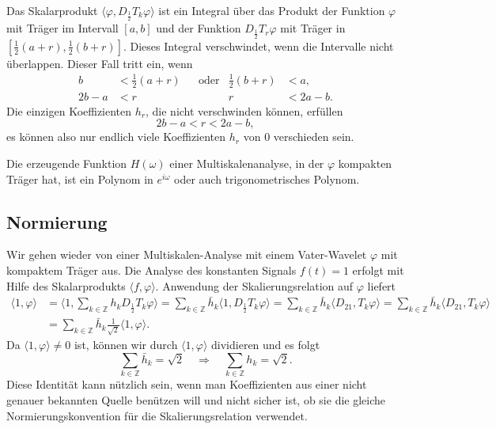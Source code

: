 Das Skalarprodukt
$\langle \varphi, D_{\frac12}T_k\varphi\rangle$
ist ein Integral über das Produkt der Funktion $\varphi$ mit Träger im Intervall
$[a,b]$ und der Funktion $D_{\frac12}T_r\varphi$  mit Träger in
$[\frac12(a+r),\frac12(b+r)]$.
Dieses Integral verschwindet, wenn die Intervalle nicht überlappen.
Dieser Fall tritt ein, wenn
\[
\begin{aligned}
b&<\frac12(a+r) &&\text{oder}& \frac12(b+r) &< a,
\\
2b-a&<r         &&           &            r &< 2a-b.
\end{aligned}
\]
Die einzigen Koeffizienten $h_r$, die nicht verschwinden können, erfüllen
\[
2b-a < r < 2a-b,
\]
es können also nur endlich viele Koeffizienten $h_r$ von $0$ verschieden
sein.

\begin{konsequenz}
Die erzeugende Funktion $H(\omega)$ einer Multiskalenanalyse, in der
$\varphi$ kompakten Träger hat, ist ein Polynom in $e^{i\omega}$ oder auch
trigonometrisches Polynom.
\end{konsequenz}

\subsection{Normierung}
%
Wir gehen wieder von einer Multiskalen-Analyse mit einem Vater-Wavelet
$\varphi$ mit kompaktem Träger aus.
Die Analyse des konstanten Signals $f(t)=1$ erfolgt mit Hilfe des
Skalarprodukts $\langle f,\varphi\rangle$.
Anwendung der Skalierungsrelation auf $\varphi$ liefert
\begin{align*}
\langle 1,\varphi\rangle
&=
\biggl\langle
1,\sum_{k\in\mathbb Z} h_kD_{\frac12}T_k\varphi
\biggr\rangle
=
\sum_{k\in\mathbb Z}
\bar{h}_k
\langle
1,
D_{\frac12}T_k\varphi
\rangle
=
\sum_{k\in\mathbb Z}
\bar{h}_k
\langle
D_21,
T_k\varphi
\rangle
=
\sum_{k\in\mathbb Z}
\bar{h}_k
\langle
D_21,
T_k\varphi
\rangle
\\
&=
\sum_{k\in\mathbb Z}
\bar{h}_k
\frac{1}{\sqrt{2}}
\langle 1,\varphi\rangle.
\end{align*}
Da $\langle 1,\varphi\rangle\ne 0$ ist, können wir durch
$\langle 1,\varphi\rangle$ dividieren und es folgt
\begin{equation}
\sum_{k\in\mathbb Z} \bar{h}_k = \sqrt{2}
\quad\Rightarrow\quad
\sum_{k\in\mathbb Z} h_k = \sqrt{2}.
\label{buch:kompakt:hsumme}
\end{equation}
Diese Identität kann nützlich sein, wenn man Koeffizienten aus einer
nicht genauer bekannten Quelle benützen will und nicht sicher ist,
ob sie die gleiche Normierungskonvention für die Skalierungsrelation
verwendet.

